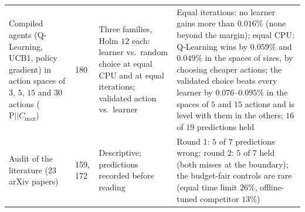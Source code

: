 \begin{longtable}{@{}p{}p{}p{}p{}@{}}
Compiled agents (Q-Learning, UCB1, policy gradient) in action spaces of $3$, $5$, $15$ and $30$ actions ($\mathrm{P}||C_{\max}$) & 180 & Three families, Holm $12$ each: learner vs.\ random choice at equal CPU and at equal iterations; validated action vs.\ learner & Equal iterations: no learner gains more than $0.016\%$ (none beyond the margin); equal CPU: Q-Learning wins by $0.059\%$ and $0.049\%$ in the spaces of sizes, by choosing cheaper actions; the validated choice beats every learner by $0.076$--$0.095\%$ in the spaces of $5$ and $15$ actions and is level with them in the others; $16$ of $19$ predictions held \\
Audit of the literature (23 arXiv papers) & 159, 172 & Descriptive; predictions recorded before reading & Round 1: $5$ of $7$ predictions wrong; round 2: $5$ of $7$ held (both misses at the boundary); the budget-fair controls are rare (equal time limit $26\%$, offline-tuned competitor $13\%$) \\
\bottomrule
\end{longtable}
